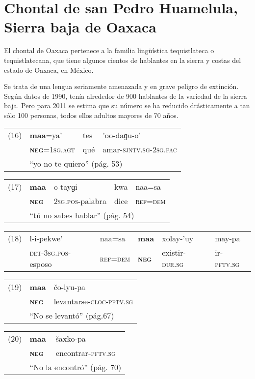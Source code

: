 \section*{Chontal de san Pedro Huamelula, Sierra baja de Oaxaca}

\noindent El chontal de Oaxaca pertenece a la familia lingüística tequistlateca o tequistlatecana, que tiene algunos cientos de hablantes en la sierra y costas del estado de Oaxaca, en México.

Se trata de una lengua seriamente amenazada y en grave peligro de extinción. Según datos de 1990, tenía alrededor de 900 hablantes de la variedad de la sierra baja. Pero para 2011 se estima que su número se ha reducido drásticamente a tan sólo 100 personas, todos ellos adultos mayores de 70 años. \vspace{0.5cm}

{\setmainfont{Charis SIL}

\begin{tabular}{llll}
(16) & \textbf{maa}=ya'& tes & 'oo-daɡu-o' \\
& \textsc{\textbf{neg}}=\textsc{1sg.agt} & qué & amar-\textsc{sjntv.sg-2sg.pac} \\
& \multicolumn{3}{l}{``yo no te quiero'' (pág. 53)}
\end{tabular} \vspace{0.5cm}

\begin{tabular}{lllll}
(17) & \textbf{maa} & o-tayɡi & kwa & naa=sa \\
& \textsc{\textbf{neg}} & \textsc{2sg.pos}-palabra & dice & \textsc{ref=dem} \\
& \multicolumn{4}{l}{``tú no sabes hablar'' (pág. 54)}
\end{tabular} \vspace{0.5cm}

\begin{tabular}{llllll}
(18) & l-i-pekwe’ & naa=sa & \textbf{maa} & xolay-’uy & may-pa \\
& \textsc{det-3sg.pos}-esposo & \textsc{ref=dem} & \textsc{\textbf{neg}} & existir-\textsc{dur.sg} & ir-\textsc{pftv.sg} \\
\end{tabular} \vspace{0.5cm}

\begin{tabular}{lll}
(19) & \textbf{maa} & čo-lyu-pa \\
& \textsc{\textbf{neg}} & levantarse-\textsc{cloc-pftv.sg} \\
& \multicolumn{2}{l}{``No se levantó'' (pág.67)}
\end{tabular} \vspace{0.5cm}

\begin{tabular}{lll}
(20) & \textbf{maa} & šaxko-pa \\
& \textsc{\textbf{neg}} & encontrar-\textsc{pftv.sg} \\
& \multicolumn{2}{l}{``No la encontró'' (pág. 70)}
\end{tabular} \vspace{0.5cm}

}

